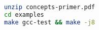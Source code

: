 \begin{lstlisting}[language=bash, morekeywords={unzip, make},
                                  deletekeywords={test}]
unzip concepts-primer.pdf
cd examples
make gcc-test && make -j8
\end{lstlisting}
